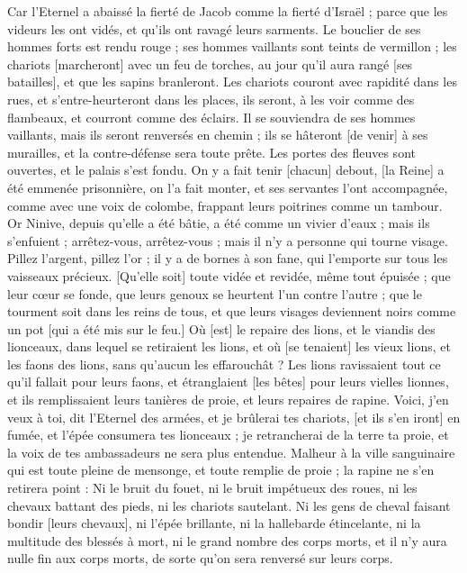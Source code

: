 \begin{multicols}{2}
Car l'Eternel a abaissé la fierté de Jacob comme la fierté d'Israël ; parce que les videurs les ont vidés, et qu'ils ont ravagé leurs sarments.
Le bouclier de ses hommes forts est rendu rouge ; ses hommes vaillants sont teints de vermillon ; les chariots [marcheront] avec un feu de torches, au jour qu'il aura rangé [ses batailles], et que les sapins branleront.
Les chariots couront avec rapidité dans les rues, et s'entre-heurteront dans les places, ils seront, à les voir comme des flambeaux, et courront comme des éclairs.
Il se souviendra de ses hommes vaillants, mais ils seront renversés en chemin ; ils se hâteront [de venir] à ses murailles, et la contre-défense sera toute prête.
Les portes des fleuves sont ouvertes, et le palais s'est fondu.
On y a fait tenir [chacun] debout, [la Reine] a été emmenée prisonnière, on l'a fait monter, et ses servantes l'ont accompagnée, comme avec une voix de colombe, frappant leurs poitrines comme un tambour.
Or Ninive, depuis qu'elle a été bâtie, a été comme un vivier d'eaux ; mais ils s'enfuient ; arrêtez-vous, arrêtez-vous ; mais il n'y a personne qui tourne visage.
Pillez l'argent, pillez l'or ; il y a de bornes à son fane, qui l'emporte sur tous les vaisseaux précieux.
[Qu'elle soit] toute vidée et revidée, même tout épuisée ; que leur cœur se fonde, que leurs genoux se heurtent l'un contre l'autre ; que le tourment soit dans les reins de tous, et que leurs visages deviennent noirs comme un pot [qui a été mis sur le feu.]
Où [est] le repaire des lions, et le viandis des lionceaux, dans lequel se retiraient les lions, et où [se tenaient] les vieux lions, et les faons des lions, sans qu'aucun les effarouchât ?
Les lions ravissaient tout ce qu'il fallait pour leurs faons, et étranglaient [les bêtes] pour leurs vielles lionnes, et ils remplissaient leurs tanières de proie, et leurs repaires de rapine.
Voici, j'en veux à toi, dit l'Eternel des armées, et je brûlerai tes chariots, [et ils s'en iront] en fumée, et l'épée consumera tes lionceaux ; je retrancherai de la terre ta proie, et la voix de tes ambassadeurs ne sera plus entendue.
\VerseOne{}Malheur à la ville sanguinaire qui est toute pleine de mensonge, et toute remplie de proie ; la rapine ne s'en retirera point :
Ni le bruit du fouet, ni le bruit impétueux des roues, ni les chevaux battant des pieds, ni les chariots sautelant.
Ni les gens de cheval faisant bondir [leurs chevaux], ni l'épée brillante, ni la hallebarde étincelante, ni la multitude des blessés à mort, ni le grand nombre des corps morts, et il n'y aura nulle fin aux corps morts, de sorte qu'on sera renversé sur leurs corps.

\end{multicols}
